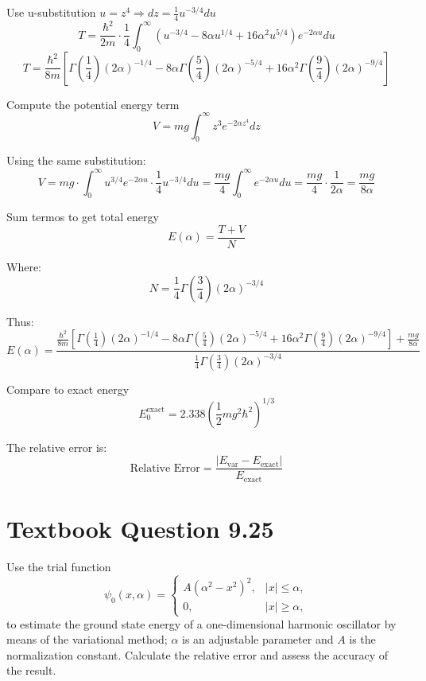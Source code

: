 \documentclass[12pt]{article}
\begin{document}
        Use u-substitution 
        \( 
            u = z^4 \Rightarrow dz = \frac{1}{4} u^{-3/4} du 
        \)
        \[
            T = \frac{\hbar^2}{2m} \cdot \frac{1}{4} \int_0^\infty \left( u^{-3/4} - 8\alpha u^{1/4} + 16\alpha^2 u^{5/4} \right) e^{-2\alpha u} du
        \]
        \[
            T = \frac{\hbar^2}{8m} \left[
            \Gamma\left(\frac{1}{4}\right)(2\alpha)^{-1/4}
            - 8\alpha \Gamma\left(\frac{5}{4}\right)(2\alpha)^{-5/4}
            + 16\alpha^2 \Gamma\left(\frac{9}{4}\right)(2\alpha)^{-9/4} \right]
        \]
        
        Compute the potential energy term
        \[
            V = mg \int_0^\infty z^3 e^{-2\alpha z^4} dz
        \]

        Using the same substitution:
        \[
            V = mg \cdot \int_0^\infty u^{3/4} e^{-2\alpha u} \cdot \frac{1}{4} u^{-3/4} du = \frac{mg}{4} \int_0^\infty e^{-2\alpha u} du = \frac{mg}{4} \cdot \frac{1}{2\alpha}
            = \frac{mg}{8\alpha}
        \]

        Sum termos to get total energy
        \[
            E(\alpha) = \frac{T + V}{N}
        \]

        Where:
        \[
            N = \frac{1}{4} \Gamma\left(\frac{3}{4}\right)(2\alpha)^{-3/4}
        \]

        Thus:
        \[
            E(\alpha) = \frac{
            \frac{\hbar^2}{8m} \left[ 
            \Gamma\left(\frac{1}{4}\right)(2\alpha)^{-1/4}
            - 8\alpha \Gamma\left(\frac{5}{4}\right)(2\alpha)^{-5/4}
            + 16\alpha^2 \Gamma\left(\frac{9}{4}\right)(2\alpha)^{-9/4}
            \right]
            + \frac{mg}{8\alpha}
            }{
            \frac{1}{4} \Gamma\left(\frac{3}{4}\right)(2\alpha)^{-3/4}
            }
        \]

        Compare to exact energy
        \[
            E_0^{\text{exact}} = 2.338 \left( \frac{1}{2}mg^2 \hbar^2 \right)^{1/3}
        \]
        
        The relative error is:
        \[
            \text{Relative Error} = \frac{|E_{\text{var}} - E_{\text{exact}}|}{E_{\text{exact}}}
        \]


\section{Textbook Question 9.25}
    Use the trial function 
    \[
        \psi_0(x, \alpha) =
        \begin{cases}
            A(\alpha^2 - x^2)^2, & |x| \leq \alpha, \\
            0, & |x| \geq \alpha,
        \end{cases}
    \]
    to estimate the ground state energy of a one-dimensional harmonic oscillator by means of the variational method; \( \alpha \) is an adjustable parameter and \( A \) is the normalization constant. Calculate the relative error and assess the accuracy of the result.
    
\end{document}
